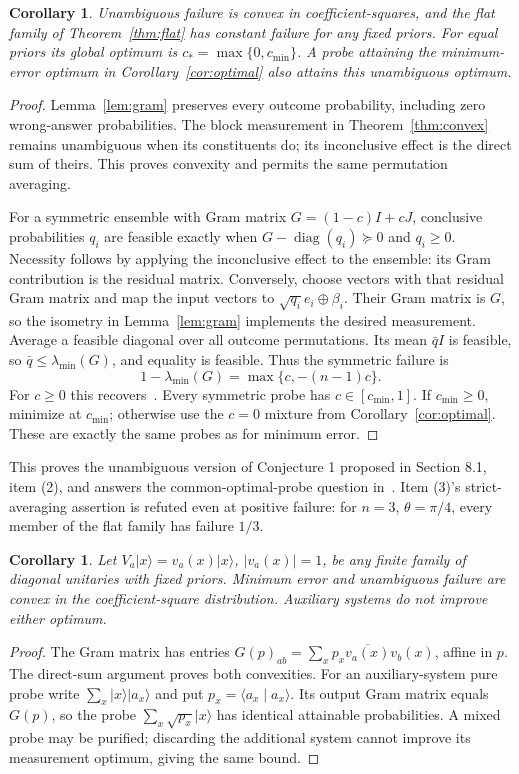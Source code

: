 \documentclass[11pt]{article}
\newtheorem{corollary}[theorem]{Corollary}
\newcommand{\ket}[1]{\lvert #1\rangle}
\begin{document}
\begin{corollary}\label{cor:ud}
Unambiguous failure is convex in coefficient-squares, and the flat
family of Theorem~\ref{thm:flat} has constant failure for any fixed priors.
For equal priors its global optimum is $c_*=\max\{0,c_{\min}\}$.
A probe attaining the minimum-error optimum in
Corollary~\ref{cor:optimal} also attains this unambiguous optimum.
\end{corollary}
\begin{proof}
Lemma~\ref{lem:gram} preserves every outcome probability, including
zero wrong-answer probabilities. The block measurement in
Theorem~\ref{thm:convex} remains unambiguous when its constituents do;
its inconclusive effect is the direct sum of theirs. This proves
convexity and permits the same permutation averaging.

For a symmetric ensemble with Gram matrix $G=(1-c)I+cJ$, conclusive
probabilities $q_i$ are feasible exactly when
$G-\operatorname{diag}(q_i)\succeq0$ and $q_i\geq0$.
Necessity follows by applying the inconclusive effect to the ensemble:
its Gram contribution is the residual matrix. Conversely, choose vectors
with that residual Gram matrix and map the input vectors to
$\sqrt{q_i}e_i\oplus\beta_i$. Their Gram matrix is $G$, so the
isometry in Lemma~\ref{lem:gram} implements the desired measurement.
Average a feasible diagonal over all outcome permutations. Its mean
$\bar q I$ is feasible, so $\bar q\leq\lambda_{\min}(G)$, and equality
is feasible. Thus the symmetric failure is
\[
 1-\lambda_{\min}(G)=\max\{c,-(n-1)c\}.
\]
For $c\geq0$ this recovers~\cite[Lemma 3]{ZGH}. Every symmetric probe
has $c\in[c_{\min},1]$. If $c_{\min}\geq0$, minimize at $c_{\min}$;
otherwise use the $c=0$ mixture from Corollary~\ref{cor:optimal}.
These are exactly the same probes as for minimum error.
\end{proof}

This proves the unambiguous version of Conjecture 1 proposed in
Section 8.1, item (2), and answers the common-optimal-probe question
in~\cite[Section 9, final sentence, p.~10:23]{ZGH}.
Item (3)'s strict-averaging assertion is refuted even at positive failure:
for $n=3$, $\theta=\pi/4$, every member of the flat family has
failure $1/3$.

\begin{corollary}\label{cor:patterns}
Let $V_a\ket x=v_a(x)\ket x$, $|v_a(x)|=1$, be any finite family
of diagonal unitaries with fixed priors. Minimum error and unambiguous
failure are convex in the coefficient-square distribution. Auxiliary
systems do not improve either optimum.
\end{corollary}
\begin{proof}
The Gram matrix has entries
$G(p)_{ab}=\sum_xp_x\overline{v_a(x)}v_b(x)$, affine in $p$.
The direct-sum argument proves both convexities. For an auxiliary-system
pure probe write $\sum_x\ket x\ket{a_x}$ and put
$p_x=\langle a_x\mid a_x\rangle$. Its output Gram matrix equals
$G(p)$, so the probe $\sum_x\sqrt{p_x}\ket x$ has identical attainable
probabilities. A mixed probe may be purified; discarding the additional
system cannot improve its measurement optimum, giving the same bound.
\end{proof}
\end{document}
